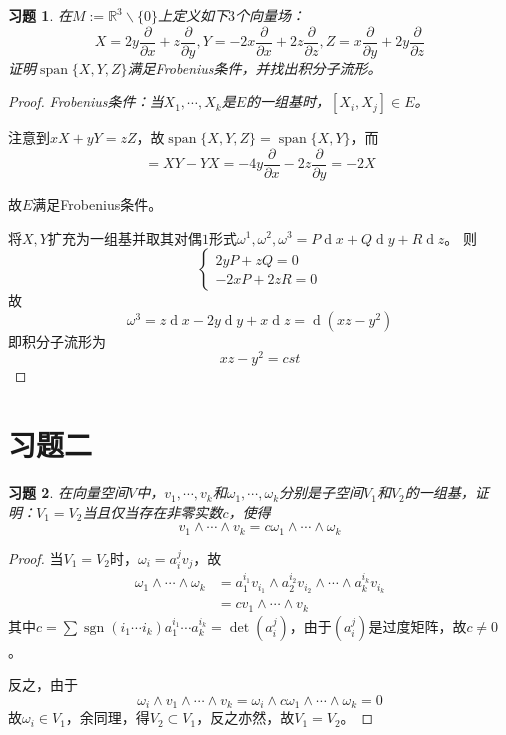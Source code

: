 \documentclass[winfonts,UTF8,c5size,a4paper,fancyhdr,hyperref,titlepage,nocap]{ctexart}
\newtheorem{xiti}{习题}
\theoremstyle{definition}
\theoremstyle{remark}
\numberwithin{equation}{subsection}
\newcommand{\Real}{\mathbb{R}}
\newcommand{\dd}{\operatorname{d}}
\newcommand{\pfrac}[2]{\frac{\partial{#1}}{\partial{#2}}}
\newcommand{\spa}{\operatorname{span}}
\newcommand{\sgn}{\operatorname{sgn}}
\begin{document}
\begin{xiti}
  在$M:=\Real^3\backslash\{0\}$上定义如下$3$个向量场：
  \begin{equation*}
    X=2y\pfrac{}{x}+z\pfrac{}{y}, Y=-2x\pfrac{}{x}+2z\pfrac{}{z}, Z=x\pfrac{}{y}+2y\pfrac{}{z}
  \end{equation*}
  证明$\spa\{X,Y,Z\}$满足Frobenius条件，并找出积分子流形。
\end{xiti}
\begin{proof}
  \emph{Frobenius条件：当$X_1,\cdots,X_k$是$E$的一组基时，$[X_i,X_j]\in E$。}

  注意到$xX+yY=zZ$，故$\spa\{X,Y,Z\}=\spa\{X,Y\}$，而
  \begin{equation*}
    [X,Y]=XY-YX=-4y\pfrac{}{x}-2z\pfrac{}{y}=-2X
  \end{equation*}

  故$E$满足Frobenius条件。

  将$X,Y$扩充为一组基并取其对偶$1$形式$\omega^1,\omega^2, \omega^3=P\dd x+Q\dd y+R\dd z$。
  则
  \begin{equation*}
    \begin{cases}
      2yP+zQ=0\\
      -2xP+2zR=0
    \end{cases}
  \end{equation*}
  故
  \begin{equation*}
  \omega^3=z\dd x-2y\dd y+x\dd z=\dd(xz-y^2)
  \end{equation*}
  即积分子流形为
  \begin{equation*}
    xz-y^2=cst
  \end{equation*}
\end{proof}

\section{习题二}
\begin{xiti}
  在向量空间$V$中，$v_1,\cdots,v_k$和$\omega_1,\cdots,\omega_k$分别是子空间$V_1$和$V_2$的一组基，证明：$V_1=V_2$当且仅当存在非零实数$c$，使得
  \begin{equation*}
    v_1\wedge\cdots\wedge v_k=c\omega_1\wedge\cdots\wedge\omega_k
  \end{equation*}
\end{xiti}
\begin{proof}
  当$V_1=V_2$时，$\omega_i=a_i^jv_j$，故
  \begin{align*}
    \omega_1\wedge\cdots\wedge\omega_k &=a_1^{i_1}v_{i_1}\wedge a_2^{i_2}v_{i_2}\wedge\cdots\wedge a_k^{i_k}v_{i_k} \\
     &=cv_1\wedge\cdots\wedge v_k
  \end{align*}
  其中$c=\sum\sgn(i_1\cdots i_k)a_1^{i_1}\cdots a_k^{i_k}=\det(a_i^j)$，由于$(a_i^j)$是过度矩阵，故$c\neq0$。

  反之，由于
  \begin{equation*}
  \omega_i\wedge v_1\wedge\cdots\wedge v_k=\omega_i\wedge c\omega_1\wedge\cdots\wedge\omega_k=0
  \end{equation*}
  故$\omega_i\in V_1$，余同理，得$V_2\subset V_1$，反之亦然，故$V_1=V_2$。
\end{proof}
\end{document}
